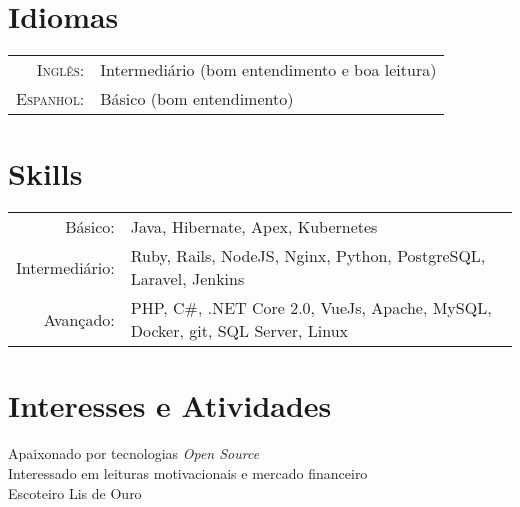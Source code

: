 \documentclass[a4paper,10pt]{article}
\begin{document}
\section{Idiomas}
\begin{tabular}{rl}
\textsc{Inglês:}&Intermediário (bom entendimento e boa leitura)\\
\textsc{Espanhol:}&Básico (bom entendimento)\\
\end{tabular}

\section{Skills}
\begin{tabular}{rl}
 Básico:& Java, Hibernate, Apex, Kubernetes \setmainfont[SmallCapsFont=Fontin-SmallCaps.otf]{Fontin.otf}\\
 Intermediário:& Ruby, Rails, NodeJS, Nginx, Python, PostgreSQL, Laravel, Jenkins \\
 Avançado:& PHP, C\#, .NET Core 2.0, VueJs, Apache, MySQL, Docker, git, SQL Server, Linux
\end{tabular}

\section{Interesses e Atividades}
Apaixonado por tecnologias \textit{Open Source}\\
Interessado em leituras motivacionais e mercado financeiro\\
Escoteiro Lis de Ouro \\
\end{document}
